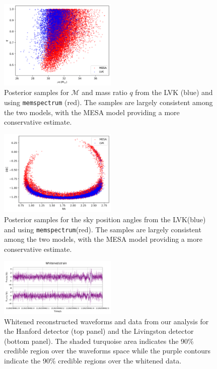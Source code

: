 \documentclass[epj,nopacs]{svjour}
\begin{document}
\begin{figure}
	\caption{Posterior samples for $\mathcal{M}$ and mass ratio $q$ from the LVK (blue) and using \texttt{memspectrum} (red). The samples are largely consistent among the two models, with the MESA model providing a more conservative estimate.}
	\label{fig:gw150914_masses}
	\includegraphics[width=0.5\textwidth,keepaspectratio]{Images/gw150914/masses.png}
\end{figure}
\begin{figure}
	\caption{Posterior samples for the sky position angles from the LVK(blue) and using \texttt{memspectrum}(red). The samples are largely consistent among the two models, with the MESA model providing a more conservative estimate.}
	\label{fig:gw150914_sky}
	\includegraphics[width=0.5\textwidth,keepaspectratio]{Images/gw150914/sky_position.png}
\end{figure}
\begin{figure}
	\caption{Whitened reconstructed waveforms and data from our analysis for the Hanford detector (top panel) and the Livingston detector (bottom panel). The shaded turquoise area indicates the 90\% credible region over the waveforms space while the purple contours indicate the 90\% credible regions over the whitened data.}
	\label{fig:gw150914_waveforms}
	\includegraphics[width=0.5\textwidth,keepaspectratio]{Images/gw150914/waveforms.pdf}
\end{figure}
\end{document}
